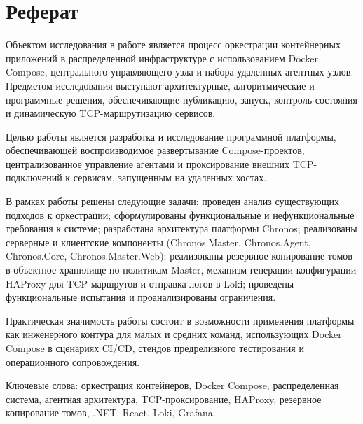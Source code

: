 \section*{Реферат}

Объектом исследования в работе является процесс оркестрации контейнерных приложений в распределенной инфраструктуре с использованием Docker Compose, центрального управляющего узла и набора удаленных агентных узлов. Предметом исследования выступают архитектурные, алгоритмические и программные решения, обеспечивающие публикацию, запуск, контроль состояния и динамическую TCP-маршрутизацию сервисов.

Целью работы является разработка и исследование программной платформы, обеспечивающей воспроизводимое развертывание Compose-проектов, централизованное управление агентами и проксирование внешних TCP-подключений к сервисам, запущенным на удаленных хостах.

В рамках работы решены следующие задачи: проведен анализ существующих подходов к оркестрации; сформулированы функциональные и нефункциональные требования к системе; разработана архитектура платформы Chronos; реализованы серверные и клиентские компоненты (Chronos.Master, Chronos.Agent, Chronos.Core, Chronos.Master.Web); реализованы резервное копирование томов в объектное хранилище по политикам Master, механизм генерации конфигурации HAProxy для TCP-маршрутов и отправка логов в Loki; проведены функциональные испытания и проанализированы ограничения.

Практическая значимость работы состоит в возможности применения платформы как инженерного контура для малых и средних команд, использующих Docker Compose в сценариях CI/CD, стендов предрелизного тестирования и операционного сопровождения.

Ключевые слова: оркестрация контейнеров, Docker Compose, распределенная система, агентная архитектура, TCP-проксирование, HAProxy, резервное копирование томов, .NET, React, Loki, Grafana.
